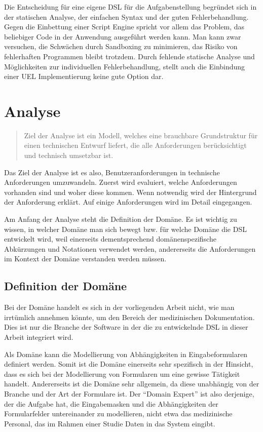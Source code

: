 Die Entscheidung für eine eigene DSL für die Aufgabenstellung begründet sich in der statischen Analyse, der einfachen Syntax und der guten Fehlerbehandlung. Gegen die Einbettung einer Script Engine spricht vor allem das Problem, das beliebiger Code in der Anwendung ausgeführt werden kann. Man kann zwar versuchen, die Schwächen durch Sandboxing zu minimieren, das Risiko von fehlerhaften Programmen bleibt trotzdem. Durch fehlende statische Analyse und Möglichkeiten zur individuellen Fehlerbehandlung, stellt auch die Einbindung einer UEL Implementierung keine gute Option dar.

\chapter{Analyse}
\label{chapter_analyse}

\begin{quote}
Ziel der Analyse ist ein Modell, welches eine brauchbare Grundstruktur für einen technischen Entwurf liefert, die alle Anforderungen berücksichtigt und technisch umsetzbar ist. \cite{ZuGr04}
\end{quote}

Das Ziel der Analyse ist es also, Benutzeranforderungen in technische Anforderungen umzuwandeln. Zuerst wird evaluiert, welche Anforderungen vorhanden sind und woher diese kommen. Wenn not\-wen\-dig wird der Hintergrund der Anforderung erklärt. Auf einige Anforderungen wird im Detail eingegangen.

Am Anfang der Analyse steht die Definition der Domäne. Es ist wichtig zu wissen, in welcher Domäne man sich bewegt bzw. für welche Domäne die DSL entwickelt wird, weil einerseits dement\-sprech\-end domänenspezifische Abkürzungen und Notationen verwendet werden, andererseits die Anforderungen im Kontext der Domäne verstanden werden müssen.


\section{Definition der Domäne}

Bei der Domäne handelt es sich in der vorliegenden Arbeit nicht, wie man irrtümlich annehmen könnte, um den Bereich der medizinischen Dokumentation. Dies ist nur die Branche der Software in der die zu entwickelnde DSL in dieser Arbeit integriert wird. 

Als Domäne kann die Modellierung von Abhängigkeiten in Eingabeformularen definiert werden. Somit ist die Domäne einerseits sehr spezifisch in der Hinsicht, dass es sich bei der Modellierung von Formularen um eine gewisse Tätigkeit handelt. Andererseits ist die Domäne sehr allgemein, da diese unabhängig von der Branche und der Art der Formulare ist. Der ``Domain Expert''\cite{MeHe05} ist also derjenige, der die Aufgabe hat, die Eingabemasken und die Abhängigkeiten der Formularfelder untereinander zu modellieren, nicht etwa das medizinische Personal, das im Rahmen einer Studie Daten in das System eingibt.


